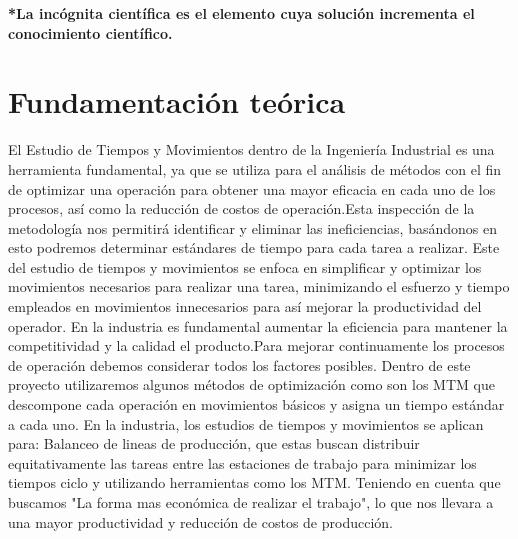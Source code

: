     \textbf{*La incógnita científica es el elemento cuya solución incrementa el conocimiento
    científico.}
    \section{Fundamentación teórica}
    El Estudio de Tiempos y Movimientos dentro de la Ingeniería Industrial es una herramienta fundamental, ya que se utiliza para el análisis de métodos con el fin de optimizar una operación para obtener una mayor eficacia en cada uno de los procesos, así como la reducción de costos de operación.Esta inspección de la metodología nos permitirá identificar y eliminar las ineficiencias, basándonos en esto podremos determinar estándares de tiempo para cada tarea a realizar. Este  del estudio de tiempos y movimientos se enfoca en simplificar y optimizar los movimientos necesarios para realizar una tarea, minimizando el esfuerzo y tiempo empleados en movimientos innecesarios para así mejorar la productividad del operador.\cite{JFT}
    En la industria es fundamental aumentar la eficiencia para mantener la competitividad y la calidad el producto.Para mejorar continuamente los procesos de operación debemos considerar todos los factores posibles. Dentro de este proyecto utilizaremos algunos métodos de optimización como son los MTM que descompone cada operación en movimientos básicos y asigna un tiempo estándar a cada uno.
    En la industria, los estudios de tiempos y movimientos se aplican para:
    Balanceo de lineas de producción, que estas buscan distribuir equitativamente las tareas entre las estaciones de trabajo para minimizar los tiempos ciclo y utilizando herramientas como los MTM.
     Teniendo en cuenta que buscamos "La forma mas económica de realizar el trabajo", lo que nos llevara a una mayor productividad y reducción de costos de producción. 
    
